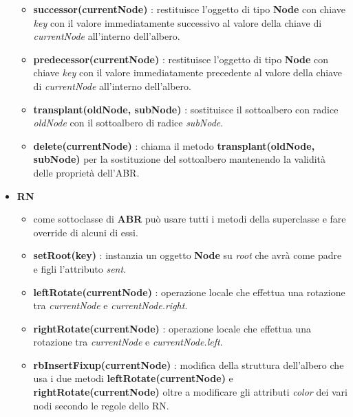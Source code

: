 \begin{itemize}
\begin{itemize}
        \item \textbf{successor(currentNode)} : restituisce l'oggetto di tipo \textbf{Node} con chiave \textit{key} con il valore immediatamente successivo al valore della chiave di \textit{currentNode} all'interno dell'albero.
        
        \item \textbf{predecessor(currentNode)} : restituisce l'oggetto di tipo \textbf{Node} con chiave \textit{key} con il valore immediatamente precedente al valore della chiave di \textit{currentNode} all'interno dell'albero.
        
        \item \textbf{transplant(oldNode, subNode)} : sostituisce il sottoalbero con radice \textit{oldNode} con il sottoalbero di radice \textit{subNode}.
        
        \item \textbf{delete(currentNode)} : chiama il metodo \textbf{transplant(oldNode, subNode)} per la sostituzione del sottoalbero mantenendo la validità delle proprietà dell'ABR.
        
    \end{itemize}
    
    \item \textbf{RN}
    \begin{itemize}
    
        \item come sottoclasse di \textbf{ABR} può usare tutti i metodi della superclasse e fare override di alcuni di essi.
        
        \item \textbf{setRoot(key)} : instanzia un oggetto \textbf{Node} su \textit{root} che avrà come padre e figli l'attributo \textit{sent}.
        
        \item \textbf{leftRotate(currentNode)} : operazione locale che effettua una rotazione tra \textit{currentNode} e \textit{currentNode.right}.
        
        \item \textbf{rightRotate(currentNode)} : operazione locale che effettua una rotazione tra \textit{currentNode} e \textit{currentNode.left}.
        
        \item \textbf{rbInsertFixup(currentNode)} : modifica della struttura dell'albero che usa i due metodi \textbf{leftRotate(currentNode)} e \textbf{rightRotate(currentNode)} oltre a modificare gli attributi \textit{color} dei vari nodi secondo le regole dello RN.
        

\end{itemize}
\end{itemize}
